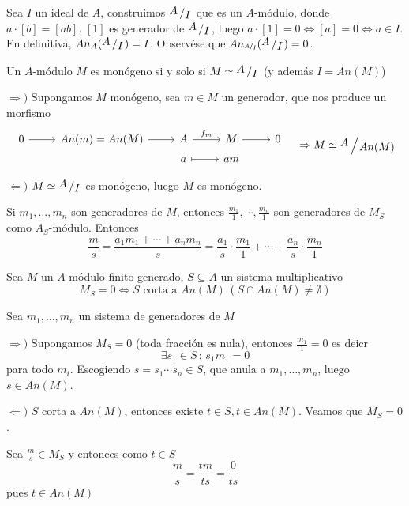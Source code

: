 Sea $I$ un ideal de $A$, construimos $\modulo{A}{I}$ que es un $A$-m\'odulo, donde $a\cdot [b]=[ab]$. 
$[1]$ es generador de $\modulo{A}{I}$, luego $a\cdot [1]=0 \iff [a]=0 \iff a \in I$. 
En definitiva, $An_A(\modulo{A}{I}) = I$. Observ\'ese que $An_{\nicefrac{A}{I}}(\modulo{A}{I})=0$. 
\begin{prop}
    Un $A$-m\'odulo $M$ es mon\'ogeno si y solo si $M \simeq \modulo{A}{I}$ (y adem\'as $I=An(M)$)
\end{prop}
\begin{dem} 
    $\Rightarrow)$ Supongamos $M$ mon\'ogeno, sea $m \in M$ un generador, que nos produce un morfismo 
    $$\bt 0 \arrow{r} & An (m) = An(M) \arrow{r} &A \arrow{r}{f_m} & M \arrow{r} & 0  \\[-5mm] & & a \arrow[mapsto]{r}& am \et \quad  \Rightarrow M \simeq \modulo{A}{An(M)}$$

    $\Leftarrow)$ $M \simeq \modulo{A}{I}$ es mon\'ogeno, luego $M$ es mon\'ogeno.
\end{dem} 
\begin{obs}
    Si $m_1, \ldots, m_n$ son generadores de $M$, entonces $\frac{m_1}{1}, \cdots, \frac{m_n}{1}$ son generadores de $M_S$ como $A_S$-m\'odulo. Entonces
    $$\frac{m}{s} = \frac{a_1m_1+\cdots+a_nm_n }{s} = \frac{a_1}{s} \cdot \frac{m_1}{1} + \cdots +\frac{a_n}{s} \cdot \frac{m_n}{1}$$
\end{obs}
\begin{prop}
Sea $M$ un $A$-m\'odulo finito generado, $S\subseteq A$ un sistema multiplicativo
$$M_S = 0  \iff S \text{ corta a } An(M) \, (S\cap An(M) \neq \emptyset)$$
\end{prop}\begin{dem} Sea $m_1, \ldots, m_n$ un sistema de generadores de $M$
    
    $\Rightarrow)$ Supongamos $M_S = 0$ (toda fracci\'on es nula), entonces $\frac{m_1}{1} =0$ es deicr
    $$\exists s_1\in S\, : \, s_1 m_1 = 0$$
    para todo $m_i$. Escogiendo $s = s_1 \cdots s_n \in S$, que anula a $m_1, \ldots, m_n$, luego $s\in An(M)$. 

    $\Leftarrow)$ $S$ corta a $An(M)$, entonces existe $t\in S, t\in An(M)$. Veamos que $M_S=0$.

    Sea $\frac{m}{s} \in M_S$ y entonces como $t\in S$
    $$\frac{m}{s} = \frac{tm}{ts} = \frac{0}{ts}$$
    pues $t\in An(M)$
\end{dem}

